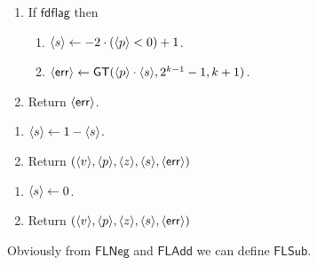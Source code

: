 \begin{enumerate}
\item If $\mathsf{fdflag}$ then
\begin{enumerate}
\item $\langle s \rangle \leftarrow -2 \cdot (\langle p \rangle < 0) + 1$.
\item $\langle \mathsf{err} \rangle \leftarrow \mathsf{GT}(\langle p \rangle \cdot \langle s \rangle,2^{k-1}-1,k+1)$. 
\end{enumerate}
\item Return $\langle \mathsf{err} \rangle$.
\end{enumerate}

\begin{enumerate}
\item $\langle s \rangle \leftarrow 1-\langle s \rangle$.
\item Return $(\langle v \rangle,\langle p \rangle,\langle z \rangle,\langle s \rangle,\langle \mathsf{err} \rangle)$
\end{enumerate}

\begin{enumerate}
\item $\langle s \rangle \leftarrow 0$.
\item Return $(\langle v \rangle,\langle p \rangle,\langle z \rangle,\langle s \rangle,\langle \mathsf{err} \rangle)$
\end{enumerate}
Obviously from $\mathsf{FLNeg}$ and $\mathsf{FLAdd}$ we can define $\mathsf{FLSub}$.

